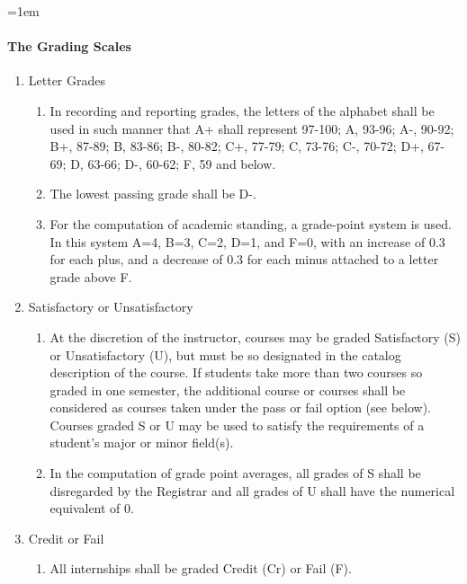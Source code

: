 \documentclass{manual}
\let\oldparagraph\paragraph
\renewcommand\paragraph{\leftskip=1em\oldparagraph}
\newcommand{\itemLevelA}{\alph*.}
\newcommand{\itemLevelB}{\arabic*)}
\newcommand{\itemRefA}{\alph*}
\newcommand{\itemRefB}{\arabic*}
\begin{document}
\paragraph{The Grading Scales}

\begin{enumerate}[label=\itemLevelA,ref=\itemRefA]

\item Letter Grades
\begin{enumerate}[label=\itemLevelB,ref=\itemRefB]
\item In recording and reporting grades, the letters of the alphabet shall be used in such manner that A+ shall represent 97-100; A, 93-96; A-, 90-92; B+, 87-89; B, 83-86; B-, 80-82; C+, 77-79; C, 73-76; C-, 70-72; D+, 67-69; D, 63-66; D-, 60-62; F, 59 and below. 

\item The lowest passing grade shall be D-. 

\item For the computation of academic standing, a grade-point system is used. In this system A=4, B=3, C=2, D=1, and F=0, with an increase of 0.3 for each plus, and a decrease of 0.3 for each minus attached to a letter grade above F. 
\end{enumerate}

\item Satisfactory or Unsatisfactory
\begin{enumerate}[label=\itemLevelB,ref=\itemRefB]
\item At the discretion of the instructor, courses may be graded Satisfactory (S) or Unsatisfactory (U), but must be so designated in the catalog description of the course. If students take more than two courses so graded in one semester, the additional course or courses shall be considered as courses taken under the pass or fail option (see below). Courses graded S or U may be used to satisfy the requirements of a student's major or minor field(s).

\item In the computation of grade point averages, all grades of S shall be disregarded by the Registrar and all grades of U shall have the numerical equivalent of 0.
\end{enumerate}

\item Credit or Fail
\begin{enumerate}[label=\itemLevelB,ref=\itemRefB]

\item All internships shall be graded Credit (Cr) or Fail (F). 


\end{enumerate}
\end{enumerate}
\end{document}
